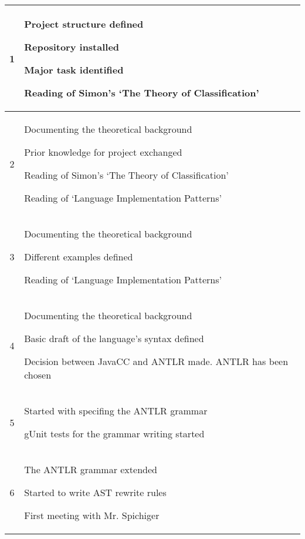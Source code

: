 \begin{center}
\begin{longtable}{|c|p{12cm}|}
1 &
\begin{journal}
	\item Project structure defined
	\item Repository installed
	\item Major task identified
	\item Reading of Simon's `The Theory of Classification'
\end{journal}
\\ \hline
2 &
\begin{journal}
	\item Documenting the theoretical background
	\item Prior knowledge for project exchanged
	\item Reading of Simon's `The Theory of Classification'
	\item Reading of `Language Implementation Patterns'
\end{journal}
\\ \hline
3 &
\begin{journal}
	\item Documenting the theoretical background
	\item Different examples defined
	\item Reading of `Language Implementation Patterns'
\end{journal}
\\ \hline
4 &
\begin{journal}
	\item Documenting the theoretical background
	\item Basic draft of the language's syntax defined
	\item Decision between JavaCC and ANTLR made. ANTLR has been chosen
\end{journal}
\\ \hline
5 &
\begin{journal}
	\item Started with specifing the ANTLR grammar
	\item gUnit tests for the grammar writing started
\end{journal}
\\ \hline
6 &
\begin{journal}
	\item The ANTLR grammar extended
	\item Started to write AST rewrite rules
	\item First meeting with Mr. Spichiger
\end{journal}
\\ \hline

\end{longtable}
\end{center}
